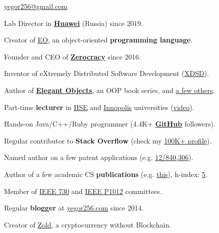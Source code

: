\documentclass{vl}
\begin{document}
    \sffamily

    \vlPrintPhoto{}

    {\scshape\bfseries\Large {}}\newline
    \href{mailto:yegor256@gmail.com}{yegor256@gmail.com}

    \vspace{1em}

    Lab Director in \textbf{\href{https://www.huawei.com}{Huawei}} (Russia) since 2019.

    Creator of \href{https://www.eolang.org}{EO}, an object-oriented \textbf{programming language}.

    Founder and CEO of \textbf{\href{https://www.zerocracy.com}{Zerocracy}} since 2016.

    Inventor of eXtremely Distributed Software Development (\href{https://www.xdsd.org}{XDSD}).

    Author of \textbf{\href{https://www.yegor256.com/elegant-objects.html}{Elegant Objects}},
    an OOP book series, and \href{https://www.yegor256.com/books.html}{a few others}.

    Part-time \textbf{lecturer} in \href{https://www.hse.ru/en/}{HSE}
    and \href{https://innopolis.university/en/}{Innopolis} universities
    (\href{https://www.youtube.com/playlist?list=PLaIsQH4uc08y14wCJMeffS2yErN4QpB8m}{video}).

    Hands-on Java/C++/Ruby programmer
    (4.4K+ \textbf{\href{https://github.com/yegor256}{GitHub}} followers).

    Regular contributor to \textbf{Stack Overflow}
    (check my \href{https://stackexchange.com/users/63162/yegor256}{100K+ profile}).

    Named author on a few patent applications
    (e.g. \href{https://www.google.com/patents/US20120023476}{12/840,306}).

    Author of a few academic CS \textbf{publications}
    (e.g. \href{https://link.springer.com/chapter/10.1007/978-3-642-02152-7_6}{this}),
    h-index: \href{https://scholar.google.com/citations?user=cYmXh60AAAAJ}{5}.

    Member of \href{http://standards.ieee.org/develop/wg/730.html}{IEEE 730} and
    \href{https://standards.ieee.org/ieee/1012/7324/}{IEEE P1012} committees.

    Regular \textbf{blogger} at \href{https://www.yegor256.com/}{yegor256.com} since 2014.

    Creator of \href{https://www.zold.io}{Zold}, a cryptocurrency without Blockchain.
\end{document}
